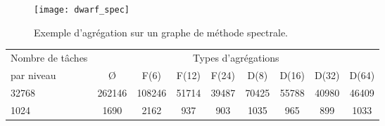 \begin{figure}
  \centering
  \texttt{[image: dwarf\_spec]}
  \caption{Exemple d'agrégation sur un graphe de méthode spectrale.}
  \label{fig:dwarf_spec}
\end{figure}
\begin{center}
  \begin{tabular}{|l|c|c|c|c|c|c|c|c|}
    \hline
   Nombre de tâches &  \multicolumn{8}{c|}{Types d'agrégations}\\
   par niveau & \O & F(6) & F(12) & F(24) & D(8) & D(16) & D(32) & D(64) \\
    \hline
   32768 & 262146 & 108246 & 51714 & 39487 & 70425 & 55788 & 40980 & 46409 \\
   1024  & 1690   & 2162   & 937   & 903   & 1035  & 965   & 899   & 1033 \\
    \hline
  \end{tabular}
  \label{tab:spectral}
\end{center}

